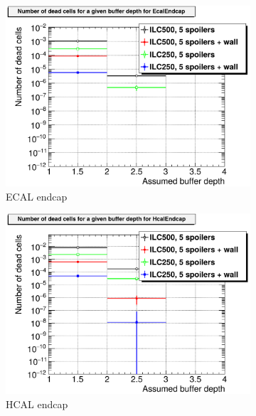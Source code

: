   \begin{figure}[htb]\ContinuedFloat
   \begin{subfigure}[b]{0.49\textwidth}
   \centering
    \includegraphics[width=\textwidth]{Figures/BDS_muons/Occupancy_Comparison_All_layers_deadcells_EcalEndcap.png}
   \caption{\sid ECAL endcap}
   \end{subfigure}
   \hfill
    \begin{subfigure}[b]{0.49\textwidth}
   \centering
    \includegraphics[width=\textwidth]{Figures/BDS_muons/Occupancy_Comparison_All_layers_deadcells_HcalEndcap.png}
   \caption{\sid HCAL endcap}
   \end{subfigure}\\
   \begin{subfigure}[b]{0.49\textwidth}

\end{subfigure}
\end{figure}

